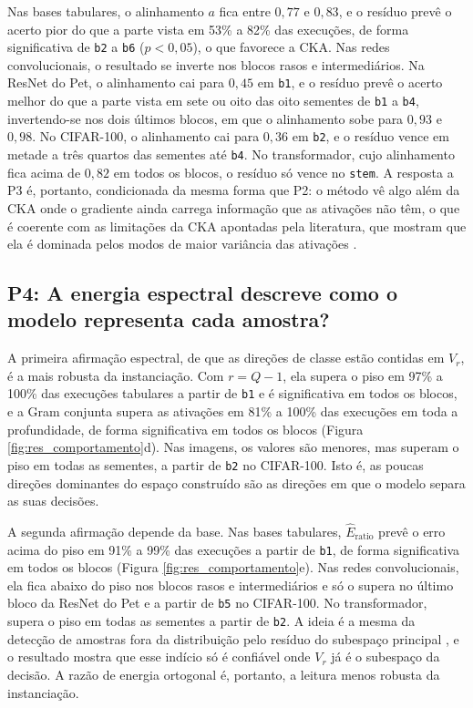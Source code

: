 Nas bases tabulares, o alinhamento $a$ fica entre $0{,}77$ e $0{,}83$, e o resíduo prevê o acerto pior do que a parte vista em 53\% a 82\% das execuções, de forma significativa de \texttt{b2} a \texttt{b6} ($p < 0{,}05$), o que favorece a CKA. Nas redes convolucionais, o resultado se inverte nos blocos rasos e intermediários. Na ResNet do Pet, o alinhamento cai para $0{,}45$ em \texttt{b1}, e o resíduo prevê o acerto melhor do que a parte vista em sete ou oito das oito sementes de \texttt{b1} a \texttt{b4}, invertendo-se nos dois últimos blocos, em que o alinhamento sobe para $0{,}93$ e $0{,}98$. No CIFAR-100, o alinhamento cai para $0{,}36$ em \texttt{b2}, e o resíduo vence em metade a três quartos das sementes até \texttt{b4}. No transformador, cujo alinhamento fica acima de $0{,}82$ em todos os blocos, o resíduo só vence no \texttt{stem}. A resposta a P3 é, portanto, condicionada da mesma forma que P2: o método vê algo além da CKA onde o gradiente ainda carrega informação que as ativações não têm, o que é coerente com as limitações da CKA apontadas pela literatura, que mostram que ela é dominada pelos modos de maior variância das ativações \citep{Davari2023, Klabunde2025}.

\subsection{P4: A energia espectral descreve como o modelo representa cada amostra?}\label{subsec:res_espectro}

A primeira afirmação espectral, de que as direções de classe estão contidas em $V_r$, é a mais robusta da instanciação. Com $r = Q-1$, ela supera o piso em 97\% a 100\% das execuções tabulares a partir de \texttt{b1} e é significativa em todos os blocos, e a Gram conjunta supera as ativações em 81\% a 100\% das execuções em toda a profundidade, de forma significativa em todos os blocos (Figura \ref{fig:res_comportamento}d). Nas imagens, os valores são menores, mas superam o piso em todas as sementes, a partir de \texttt{b2} no CIFAR-100. Isto é, as poucas direções dominantes do espaço construído são as direções em que o modelo separa as suas decisões.

A segunda afirmação depende da base. Nas bases tabulares, $\widehat{E}_{\mathrm{ratio}}$ prevê o erro acima do piso em 91\% a 99\% das execuções a partir de \texttt{b1}, de forma significativa em todos os blocos (Figura \ref{fig:res_comportamento}e). Nas redes convolucionais, ela fica abaixo do piso nos blocos rasos e intermediários e só o supera no último bloco da ResNet do Pet e a partir de \texttt{b5} no CIFAR-100. No transformador, supera o piso em todas as sementes a partir de \texttt{b2}. A ideia é a mesma da detecção de amostras fora da distribuição pelo resíduo do subespaço principal \citep{Wang2022ViM}, e o resultado mostra que esse indício só é confiável onde $V_r$ já é o subespaço da decisão. A razão de energia ortogonal é, portanto, a leitura menos robusta da instanciação.

